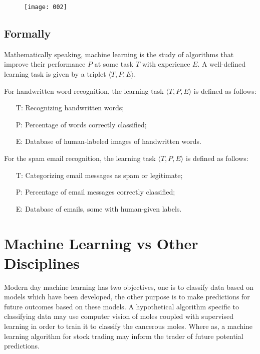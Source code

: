 \begin{figure}[t!]
  \begin{center}
  \texttt{[image: 002]}
  \end{center}
\end{figure}

\subsection{Formally}
Mathematically speaking, machine learning is the study of algorithms that improve their performance \(P\) at some task \(T\) with experience \(E\). A well-defined learning task is given by a triplet \( \langle T,P,E \rangle \).

\begin{example}
    For handwritten word recognition, the learning task \( \langle T,P,E \rangle \) is defined as follows:
    \begin{itemize}
        \item[T:] Recognizing handwritten words;
        \item[P:] Percentage of words correctly classified;
        \item[E:] Database of human-labeled images of handwritten words.
    \end{itemize}
    \tcblower
    For the spam email recognition, the learning task \( \langle T,P,E \rangle \) is defined as follows:
    \begin{itemize}
      \item[T:] Categorizing email messages as spam or legitimate;
      \item[P:] Percentage of email messages correctly classified;
      \item[E:] Database of emails, some with human-given labels.
    \end{itemize}
\end{example}

\section{Machine Learning vs Other Disciplines}
Modern day machine learning has two objectives, one is to classify data based on models which have been developed, the other purpose is to make predictions for future outcomes based on these models. A hypothetical algorithm specific to classifying data may use computer vision of moles coupled with supervised learning in order to train it to classify the cancerous moles. Where as, a machine learning algorithm for stock trading may inform the trader of future potential predictions.

